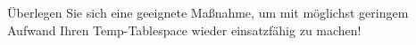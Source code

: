     \item Überlegen Sie sich eine geeignete Maßnahme, um mit möglichst geringem Aufwand Ihren Temp-Tablespace wieder einsatzfähig zu machen!
